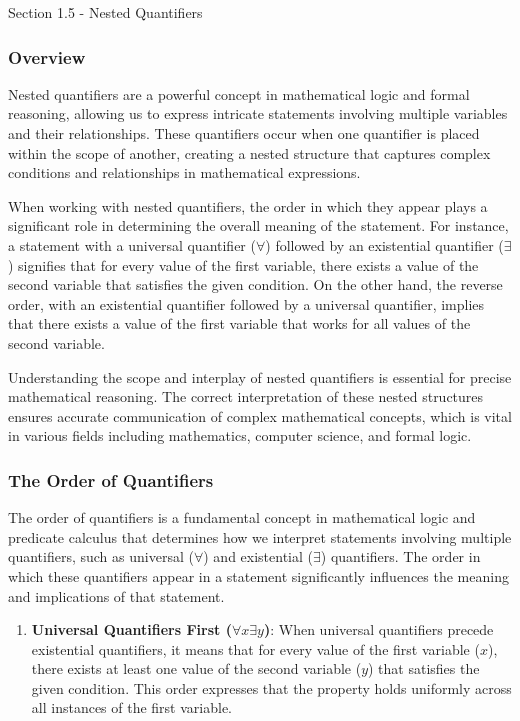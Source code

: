 \begin{notes}{Section 1.5 - Nested Quantifiers}
    \subsubsection*{Overview}

    Nested quantifiers are a powerful concept in mathematical logic and formal reasoning, allowing us to express intricate statements involving multiple variables and their relationships. These quantifiers occur when one quantifier is placed within the scope of 
    another, creating a nested structure that captures complex conditions and relationships in mathematical expressions.

    When working with nested quantifiers, the order in which they appear plays a significant role in determining the overall meaning of the statement. For instance, a statement with a universal quantifier (\(\forall\)) followed by an existential quantifier 
    (\(\exists\)) signifies that for every value of the first variable, there exists a value of the second variable that satisfies the given condition. On the other hand, the reverse order, with an existential quantifier followed by a universal quantifier, 
    implies that there exists a value of the first variable that works for all values of the second variable.

    Understanding the scope and interplay of nested quantifiers is essential for precise mathematical reasoning. The correct interpretation of these nested structures ensures accurate communication of complex mathematical concepts, which is vital in various fields 
    including mathematics, computer science, and formal logic.

    \subsubsection*{The Order of Quantifiers}

    The order of quantifiers is a fundamental concept in mathematical logic and predicate calculus that determines how we interpret statements involving multiple quantifiers, such as universal (\(\forall\)) and existential (\(\exists\)) quantifiers. The order in 
    which these quantifiers appear in a statement significantly influences the meaning and implications of that statement.
    
    \begin{enumerate}
        \item \textbf{Universal Quantifiers First (\(\forall x \exists y\))}: When universal quantifiers precede existential quantifiers, it means that for every value of the first variable (\(x\)), there exists at least one value of the second variable (\(y\)) 
        that satisfies the given condition. This order expresses that the property holds uniformly across all instances of the first variable.
        

\end{enumerate}
\end{notes}
